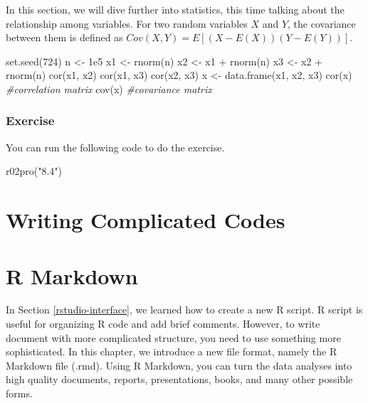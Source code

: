 \documentclass[
]{book}
\newenvironment{Shaded}{\begin{snugshade}}{\end{snugshade}}
\newcommand{\CommentTok}[1]{\textcolor[rgb]{0.56,0.35,0.01}{\textit{#1}}}
\newcommand{\DecValTok}[1]{\textcolor[rgb]{0.00,0.00,0.81}{#1}}
\newcommand{\FloatTok}[1]{\textcolor[rgb]{0.00,0.00,0.81}{#1}}
\newcommand{\FunctionTok}[1]{\textcolor[rgb]{0.00,0.00,0.00}{#1}}
\newcommand{\NormalTok}[1]{#1}
\newcommand{\OtherTok}[1]{\textcolor[rgb]{0.56,0.35,0.01}{#1}}
\newcommand{\SpecialCharTok}[1]{\textcolor[rgb]{0.00,0.00,0.00}{#1}}
\newcommand{\StringTok}[1]{\textcolor[rgb]{0.31,0.60,0.02}{#1}}
\begin{document}
In this section, we will dive further into statistics, this time talking about the relationship among variables. For two random variables \(X\) and \(Y\), the covariance between them is defined as \(Cov(X, Y) = E[(X-E(X))(Y-E(Y))]\).

\begin{Shaded}
\begin{Highlighting}[]
\FunctionTok{set.seed}\NormalTok{(}\DecValTok{724}\NormalTok{)}
\NormalTok{n }\OtherTok{\textless{}{-}} \FloatTok{1e5}
\NormalTok{x1 }\OtherTok{\textless{}{-}} \FunctionTok{rnorm}\NormalTok{(n)}
\NormalTok{x2 }\OtherTok{\textless{}{-}}\NormalTok{ x1 }\SpecialCharTok{+} \FunctionTok{rnorm}\NormalTok{(n)}
\NormalTok{x3 }\OtherTok{\textless{}{-}}\NormalTok{ x2 }\SpecialCharTok{+} \FunctionTok{rnorm}\NormalTok{(n)}
\FunctionTok{cor}\NormalTok{(x1, x2)}
\FunctionTok{cor}\NormalTok{(x1, x3)}
\FunctionTok{cor}\NormalTok{(x2, x3)}
\NormalTok{x }\OtherTok{\textless{}{-}} \FunctionTok{data.frame}\NormalTok{(x1, x2, x3)}
\FunctionTok{cor}\NormalTok{(x) }\CommentTok{\#correlation matrix}
\FunctionTok{cov}\NormalTok{(x) }\CommentTok{\#covariance matrix}
\end{Highlighting}
\end{Shaded}

\hypertarget{exercise-6}{%
\subsection{Exercise}\label{exercise-6}}

You can run the following code to do the exercise.

\begin{Shaded}
\begin{Highlighting}[]
\FunctionTok{r02pro}\NormalTok{(}\StringTok{"8.4"}\NormalTok{)}
\end{Highlighting}
\end{Shaded}

\hypertarget{write-code}{%
\chapter{Writing Complicated Codes}\label{write-code}}

\hypertarget{r-markdown}{%
\chapter{R Markdown}\label{r-markdown}}

In Section \ref{rstudio-interface}, we learned how to create a new R script. R script is useful for organizing R code and add brief comments. However, to write document with more complicated structure, you need to use something more sophisticated. In this chapter, we introduce a new file format, namely the R Markdown file (.rmd). Using R Markdown, you can turn the data analyses into high quality documents, reports, presentations, books, and many other possible forms.
\end{document}
